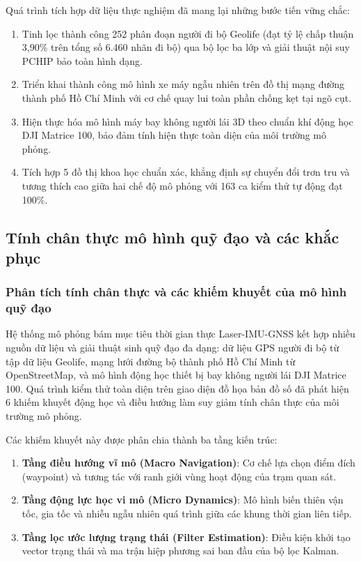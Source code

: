 \hspace{0.5cm} Quá trình tích hợp dữ liệu thực nghiệm đã mang lại những bước tiến vững chắc:
\begin{enumerate}
    \item Tinh lọc thành công 252 phân đoạn người đi bộ Geolife (đạt tỷ lệ chấp thuận 3,90\% trên tổng số 6.460 nhãn đi bộ) qua bộ lọc ba lớp và giải thuật nội suy PCHIP bảo toàn hình dạng.
    \item Triển khai thành công mô hình xe máy ngẫu nhiên trên đồ thị mạng đường thành phố Hồ Chí Minh với cơ chế quay lui toàn phần chống kẹt tại ngõ cụt.
    \item Hiện thực hóa mô hình máy bay không người lái 3D theo chuẩn khí động học DJI Matrice 100, bảo đảm tính hiện thực toàn diện của môi trường mô phỏng.
    \item Tích hợp 5 đồ thị khoa học chuẩn xác, khẳng định sự chuyển đổi trơn tru và tương thích cao giữa hai chế độ mô phỏng với 163 ca kiểm thử tự động đạt 100\%.
\end{enumerate}

\subsection{Tính chân thực mô hình quỹ đạo và các khắc phục}

\subsubsection{Phân tích tính chân thực và các khiếm khuyết của mô hình quỹ đạo}

\hspace{0.5cm} Hệ thống mô phỏng bám mục tiêu thời gian thực Laser-IMU-GNSS kết hợp nhiều nguồn dữ liệu và giải thuật sinh quỹ đạo đa dạng: dữ liệu GPS người đi bộ từ tập dữ liệu Geolife, mạng lưới đường bộ thành phố Hồ Chí Minh từ OpenStreetMap, và mô hình động học thiết bị bay không người lái DJI Matrice 100. Quá trình kiểm thử toàn diện trên giao diện đồ họa bản đồ số đã phát hiện 6 khiếm khuyết động học và điều hướng làm suy giảm tính chân thực của môi trường mô phỏng.

Các khiếm khuyết này được phân chia thành ba tầng kiến trúc:
\begin{enumerate}
    \item \textbf{Tầng điều hướng vĩ mô (Macro Navigation)}: Cơ chế lựa chọn điểm đích (waypoint) và tương tác với ranh giới vùng hoạt động của trạm quan sát.
    \item \textbf{Tầng động lực học vi mô (Micro Dynamics)}: Mô hình biến thiên vận tốc, gia tốc và nhiễu ngẫu nhiên quá trình giữa các khung thời gian liên tiếp.
    \item \textbf{Tầng lọc ước lượng trạng thái (Filter Estimation)}: Điều kiện khởi tạo vector trạng thái và ma trận hiệp phương sai ban đầu của bộ lọc Kalman.
\end{enumerate}

